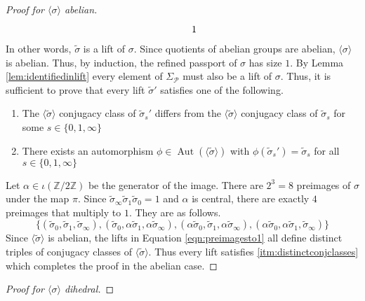 \documentclass{dcthesis}
\newcommand{\ZZ}{\mathbb Z}
\newcommand{\wt}[1]{\widetilde{#1}}
\DeclareMathOperator{\Aut}{Aut}
\numberwithin{equation}{section}
\theoremstyle{definition}
\theoremstyle{remark}
\begin{document}
{{\begin{proof}[Proof for $\langle\sigma\rangle$ abelian]
\begin{equation}
\begin{tikzcd}
                    &1
        \end{tikzcd}
      \end{equation}
      In other words,
      $\wt{\sigma}$ is a lift of $\sigma$.
      Since quotients of abelian groups are abelian,
      $\langle\sigma\rangle$ is abelian.
      Thus, by induction,
      the refined passport of $\sigma$
      has size $1$.
      By Lemma \ref{lem:identifiedinlift}
      every element of $\Sigma_\mathscr{P}$
      must also be a lift of $\sigma$.
      Thus, it is sufficient to prove that every
      lift $\wt{\sigma}'$ satisfies one
      of the following.
      \begin{enumerate}
        \item\label{itm:distinctconjclasses}
          The $\langle\wt{\sigma}\rangle$
          conjugacy class of
          $\wt{\sigma}_s'$ differs from
          the $\langle\wt{\sigma}\rangle$
          conjugacy class of
          $\wt{\sigma}_s$ for
          some $s\in \{0,1,\infty\}$
        \item\label{itm:thereexistsanauto}
          There exists an automorphism
          $\phi\in\Aut(\langle\wt{\sigma}\rangle)$
          with
          $\phi(\wt{\sigma}_s') = \wt{\sigma}_s$
          for all $s\in \{0,1,\infty\}$
      \end{enumerate}
      Let $\alpha\in\iota(\ZZ/2\ZZ)$ be the generator of the image.
      There are $2^3 = 8$ preimages of $\sigma$
      under the map $\pi$.
      Since $\wt{\sigma}_\infty\wt{\sigma}_1\wt{\sigma}_0=1$
      and $\alpha$ is central,
      there are exactly $4$ preimages
      that multiply to $1$.
      They are as follows.
      \begin{equation}
        \label{eqn:preimagesto1}
        \{
          (\wt{\sigma}_0,\wt{\sigma}_1,\wt{\sigma}_\infty),
          (\wt{\sigma}_0,\alpha\wt{\sigma}_1,\alpha\wt{\sigma}_\infty),
          (\alpha\wt{\sigma}_0,\wt{\sigma}_1,\alpha\wt{\sigma}_\infty),
          (\alpha\wt{\sigma}_0,\alpha\wt{\sigma}_1,\wt{\sigma}_\infty)
        \}
      \end{equation}
      Since $\langle\wt{\sigma}\rangle$ is abelian,
      the lifts in Equation \ref{eqn:preimagesto1}
      all define distinct triples of conjugacy
      classes of $\langle\wt{\sigma}\rangle$.
      Thus every lift satisfies \ref{itm:distinctconjclasses} which completes the proof in
      the abelian case.
    \end{proof}
    \begin{proof}[Proof for $\langle\sigma\rangle$ dihedral]

\end{proof}}}
\end{document}
